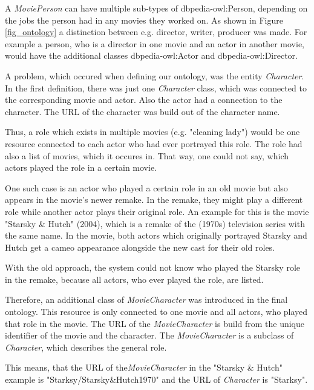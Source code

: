 A \textit{MoviePerson} can have multiple sub-types of dbpedia-owl:Person, depending on the jobs the person had in any movies they worked on.
As shown in Figure \ref{fig_ontology} a distinction between e.g. director, writer, producer was made.
For example a person, who is a director in one movie and an actor in another movie, would have the additional classes dbpedia-owl:Actor and dbpedia-owl:Director.

A problem, which occured when defining our ontology, was the entity \textit{Character}.
In the first definition, there was just one \textit{Character} class, which was connected to the corresponding movie and actor.
Also the actor had a connection to the character.
The URL of the character was build out of the character name.

Thus, a role which exists in multiple movies (e.g. "cleaning lady") would be one resource connected to each actor who had ever portrayed this role.
The role had also a list of movies, which it occures in.
That way, one could not say, which actors played the role in a certain movie.

One such case is an actor who played a certain role in an old movie but also appears in the movie's newer remake.
In the remake, they might play a different role while another actor plays their original role.
An example for this is the movie "Starsky \& Hutch" (2004), which is a remake of the (1970s) television series with the same name.
In the movie, both actors which originally portrayed Starsky and Hutch get a cameo appearance alongside the new cast for their old roles.

With the old approach, the system could not know who played the Starsky role in the remake, because all actors, who ever played the role, are listed.

Therefore, an additional class of \textit{MovieCharacter} was introduced in the final ontology.
This resource is only connected to one movie and all actors, who played that role in the movie.
The URL of the \textit{MovieCharacter} is build from the unique identifier of the movie and the character.
The \textit{MovieCharacter} is a subclass of \textit{Character}, which describes the general role.

This means, that the URL of the\textit{MovieCharacter} in the "Starsky \& Hutch" example is "Starksy/Starsky\&Hutch1970" and the URL of \textit{Character} is "Starksy".

